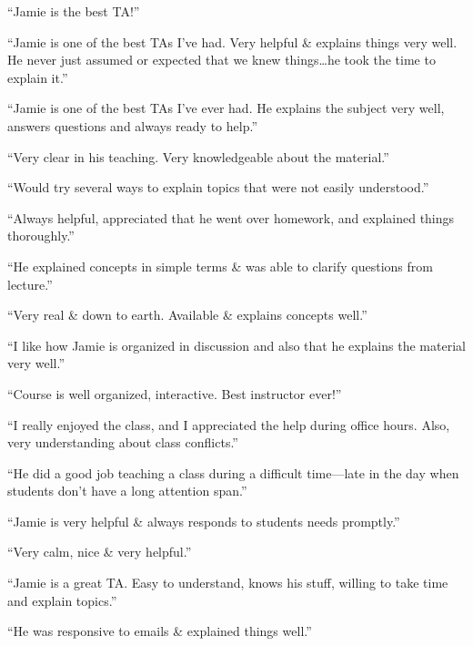 \begin{multicols}{2}
\begin{myItemize}
\item ``Jamie is the best TA!''
\item ``Jamie is one of the best TAs I've had. Very
helpful \& explains things very well. He never just assumed or
expected that we knew things\ldots he took the time to explain it.''
\item ``Jamie is one of the best TAs I've ever had. He explains the subject
very well, answers questions and always ready to help.''
\item ``Very clear in his teaching. Very knowledgeable about the material.''
\item ``Would try several ways to explain topics that were not easily
understood.''
\item ``Always helpful, appreciated that he went over homework, and explained things thoroughly.''
\item ``He explained concepts in simple terms \& was able to clarify questions from lecture.''
\item ``Very real \& down to earth. Available \& explains concepts well.''
\item ``I like how Jamie is organized in discussion and also that he explains the material very well.''
\item ``Course is well organized, interactive. Best instructor ever!''
\item ``I really enjoyed the class, and I appreciated the help during office hours. Also, very understanding about class conflicts.''
\item ``He did a good job teaching a class during a difficult time---late in the day when students don't have a long attention span.''
\item ``Jamie is very helpful \& always responds to students needs promptly.''
\item ``Very calm, nice \& very helpful.''
\item ``Jamie is a great TA. Easy to understand, knows his stuff, willing to
take time and explain topics.''
\item ``He was responsive to emails \& explained things well.''
\end{myItemize}


\end{multicols}
